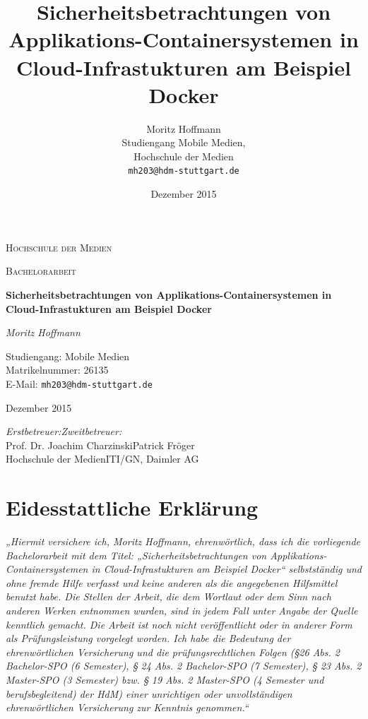 \documentclass[11pt,a4paper,oneside]{report}
\newcommand{\thema}{Sicherheitsbetrachtungen von Applikations-Containersystemen in Cloud-Infrastukturen am Beispiel Docker}
\newcommand*{\signatureAndDate}{
    \par\noindent\makebox[2.5in]{\hrulefill} \hfill\makebox[2.0in]{\hrulefill}%
    \par\noindent\makebox[2.5in][l]{Unterschrift}      \hfill\makebox[2.0in][l]{Datum}%
}
\begin{document}

\begin{titlepage}
	\centering
	{\scshape\LARGE
		Hochschule der Medien
	\par}
	\vspace{1cm}
	{\scshape\Large
		Bachelorarbeit
	\par}
	\vspace{1.5cm}
	{\huge\bfseries
		\thema
	\par}
	\vspace{2cm}
	{\Large\itshape
		Moritz Hoffmann
	\par}
	\vspace{0.5cm}
	{\Large
		Studiengang: Mobile Medien\\
		Matrikelnummer: 26135\\
		E-Mail: \texttt{mh203@hdm-stuttgart.de}
	\par}
	\vspace{1.5cm}
	{\Large Dezember 2015\par}
	\vfill
	{\Large
		\emph{Erstbetreuer:}\hfill\emph{Zweitbetreuer:}\\
		Prof. Dr. Joachim Charzinski\hfill Patrick Fröger\\
		Hochschule der Medien\hfill ITI/GN, Daimler AG
	\par}

\end{titlepage}


\title{\thema}
\author{Moritz Hoffmann\\
  Studiengang Mobile Medien,\\
  Hochschule der Medien\\
  \texttt{mh203@hdm-stuttgart.de}}
\date{Dezember 2015}
\maketitle


\chapter*{Eidesstattliche Erklärung}
\emph{„Hiermit versichere ich, Moritz Hoffmann, ehrenwörtlich, dass ich die vorliegende Bachelorarbeit mit dem Titel: „\thema“ selbstständig und ohne fremde Hilfe verfasst und keine anderen als die angegebenen Hilfsmittel benutzt habe. Die Stellen der Arbeit, die dem Wortlaut oder dem Sinn nach anderen Werken entnommen wurden, sind in jedem Fall unter Angabe der Quelle kenntlich gemacht. Die Arbeit ist noch nicht veröffentlicht oder in anderer Form als Prüfungsleistung vorgelegt worden. Ich habe die Bedeutung der ehrenwörtlichen Versicherung und die prüfungsrechtlichen Folgen (§26 Abs. 2 Bachelor-SPO (6 Semester), § 24 Abs. 2 Bachelor-SPO (7 Semester), § 23 Abs. 2 Master-SPO (3 Semester) bzw. § 19 Abs. 2 Master-SPO (4 Semester und berufsbegleitend) der HdM) einer unrichtigen oder unvollständigen ehrenwörtlichen Versicherung zur Kenntnis genommen.“
}
\vspace{1.5cm}
\signatureAndDate
\newpage
\end{document}
